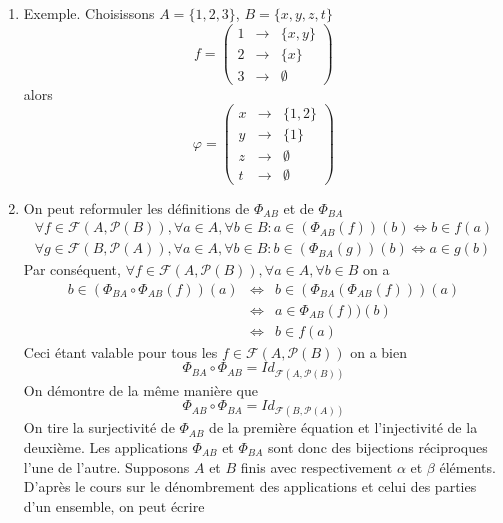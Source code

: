 \begin{enumerate}
  \item Exemple. Choisissons $A=\{1,2,3\}$, $B=\{x,y,z,t\}$
  \[f=\begin{pmatrix}
    1 & \rightarrow & \{x,y\} \\
    2 & \rightarrow & \{x\} \\
    3 & \rightarrow & \emptyset \
  \end{pmatrix}\]
  alors
\[\varphi=\begin{pmatrix}
    x & \rightarrow & \{1,2\} \\
    y & \rightarrow & \{1\} \\
    z & \rightarrow & \emptyset \\
    t & \rightarrow & \emptyset
  \end{pmatrix}\]
  \item On peut reformuler les d{\'e}finitions de $\Phi_{AB}$ et de $\Phi_{BA}$
  \begin{eqnarray*}
  \forall f \in \mathcal{F}(A,\mathcal{P}(B)), \forall a\in A,
  \forall b \in B : a\in (\Phi_{AB}(f))(b) \Leftrightarrow b\in
  f(a) \\
  \forall g \in \mathcal{F}(B,\mathcal{P}(A)), \forall a\in A,
  \forall b \in B : b\in (\Phi_{BA}(g))(b) \Leftrightarrow a\in
  g(b)
  \end{eqnarray*}
  Par cons{\'e}quent, $\forall f \in \mathcal{F}(A,\mathcal{P}(B)), \forall a\in A,
  \forall b \in B$ on a
  \begin{eqnarray*}
  b\in(\Phi_{BA}\circ \Phi_{AB}(f))(a) & \Leftrightarrow & b\in(\Phi_{BA}(
  \Phi_{AB}(f)))(a)\\
  & \Leftrightarrow & a\in \Phi_{AB}(f))(b)\\
  & \Leftrightarrow & b \in f(a)
  \end{eqnarray*}
  Ceci {\'e}tant valable pour tous les $f \in
  \mathcal{F}(A,\mathcal{P}(B))$ on a bien
  \[\Phi_{BA}\circ \Phi_{AB}=Id_{\mathcal{F}(A,\mathcal{P}(B))}\]
  On d{\'e}montre de la m{\^e}me mani{\`e}re que
  \[\Phi_{AB}\circ \Phi_{BA}=Id_{\mathcal{F}(B,\mathcal{P}(A))}\]
  On tire la surjectivit{\'e} de $\Phi_{AB}$ de la premi{\`e}re {\'e}quation et
  l'injectivit{\'e} de la deuxi{\`e}me. Les applications $\Phi_{AB}$ et
  $\Phi_{BA}$ sont donc des bijections r{\'e}ciproques l'une de
  l'autre.\newline
  Supposons $A$ et $B$ finis avec respectivement $\alpha$ et $\beta$
  {\'e}l{\'e}ments. D'apr{\`e}s le cours sur le d{\'e}nombrement des applications
  et celui des parties d'un ensemble, on peut {\'e}crire

\end{enumerate}
